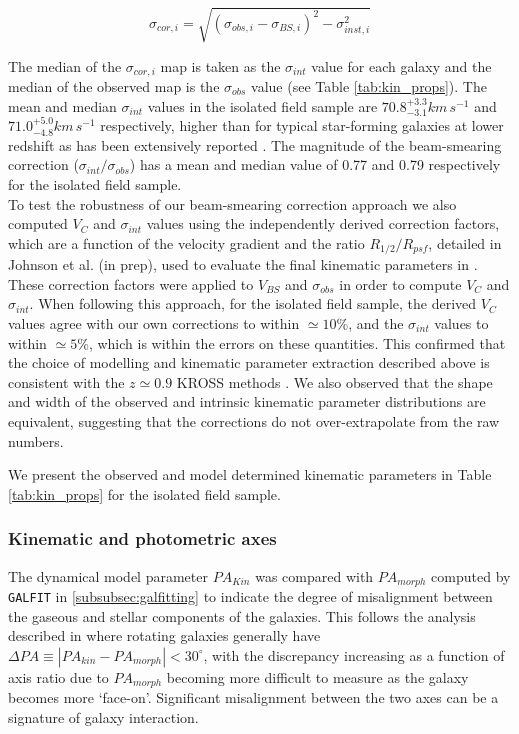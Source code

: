\documentclass[fleqn,usenatbib]{mnras}
\begin{document}
\begin{equation}\label{eq:owen_sigma}
\sigma_{cor,i} = \sqrt{\left(\sigma_{obs,i} - \sigma_{BS,i}\right)^{2} - \sigma_{inst,i}^{2}}
\end{equation}

\noindent
The median of the $\sigma_{cor,i}$ map is taken as the $\sigma_{int}$ value for each galaxy and the median of the observed map is the $\sigma_{obs}$ value (see Table \ref{tab:kin_props}).
The mean and median $\sigma_{int}$ values in the isolated field sample are $70.8^{+3.3}_{-3.1} km\,s^{-1}$ and $71.0^{+5.0}_{-4.8} km\,s^{-1}$ respectively, higher than for typical star-forming galaxies at lower redshift as has been extensively reported \citep[e.g.][]{Genzel2006,Genzel2008,ForsterSchreiber2009,Law2009,Gnerucci2011,Epinat2012,Wisnioski2015}.
The magnitude of the beam-smearing correction ($\sigma_{int}/\sigma_{obs}$) has a mean and median value of 0.77 and 0.79 respectively for the isolated field sample. \\

\noindent
To test the robustness of our beam-smearing correction approach we also computed $V_{C}$ and $\sigma_{int}$ values using the independently derived correction factors, which are a function of the velocity gradient and the ratio $R_{1/2}/R_{psf}$, detailed in Johnson et al. (in prep), used to evaluate the final kinematic parameters in \cite{Harrison2017}.
These correction factors were applied to $V_{BS}$ and $\sigma_{obs}$ in order to compute $V_{C}$ and $\sigma_{int}$.
When following this approach, for the isolated field sample, the derived $V_{C}$ values agree with our own corrections to within $\simeq10\%$, and the $\sigma_{int}$ values to within $\simeq5\%$, which is within the errors on these quantities. 
This confirmed that the choice of modelling and kinematic parameter extraction described above is consistent with the $z\simeq0.9$ KROSS methods \citep{Harrison2017}.
We also observed that the shape and width of the observed and intrinsic kinematic parameter distributions are equivalent, suggesting that the corrections do not over-extrapolate from the raw numbers.

We present the observed and model determined kinematic parameters in Table \ref{tab:kin_props} for the isolated field sample.

\subsubsection{Kinematic and photometric axes}\label{subsubsection:kin_and_phot}
The dynamical model parameter $PA_{Kin}$ was compared with $PA_{morph}$ computed by {\tt GALFIT} in \cref{subsubsec:galfitting} to indicate the degree of misalignment between the gaseous and stellar components of the galaxies.
This follows the analysis described in \citep[e.g.][]{Epinat2008,Epinat2012,Barrera-Ballesteros2014,Barrera-Ballesteros2015,Wisnioski2015,Harrison2017,Swinbank2017} where rotating galaxies generally have $\Delta PA \equiv |PA_{kin}-PA_{morph}| < 30^{\circ}$, with the discrepancy increasing as a function of axis ratio due to $PA_{morph}$ becoming more difficult to measure as the galaxy becomes more `face-on'.
Significant misalignment between the two axes can be a signature of galaxy interaction.
\end{document}
